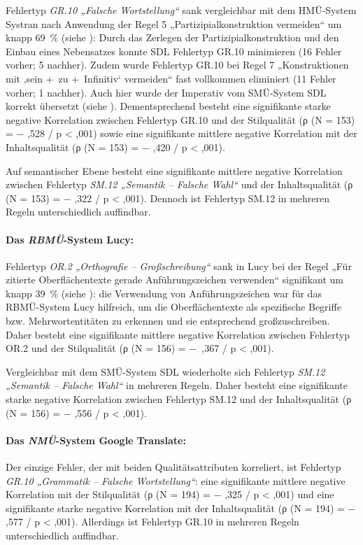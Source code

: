 Fehlertyp \textit{GR.10 „Falsche Wortstellung“} sank vergleichbar mit dem HMÜ-Sys\-tem Systran nach Anwendung der Regel 5 „Partizipialkonstruktion vermeiden“ um knapp 69~\% (siehe ): Durch das Zerlegen der Partizipialkonstruktion und den Einbau eines Nebensatzes konnte SDL Fehlertyp GR.10 minimieren (16 Fehler vorher; 5 nachher). Zudem wurde Fehlertyp GR.10 bei Regel 7 „Konstruktionen mit ‚sein +~zu +~Infinitiv‘ vermeiden“ fast vollkommen eliminiert (11 Fehler vorher; 1 nachher). Auch hier wurde der Imperativ vom SMÜ-System SDL korrekt übersetzt (siehe ). Dementsprechend besteht eine signifikante starke negative Korrelation zwischen Fehlertyp GR.10 und der Stilqualität (ρ (N = 153) = $-$ ,528 / p < ,001) sowie eine signifikante mittlere negative Korrelation mit der Inhaltsqualität (ρ (N = 153) = $-$ ,420 / p < ,001).

Auf semantischer Ebene besteht eine signifikante mittlere negative Korrelation zwischen Fehlertyp \textit{SM.12 „Semantik -- Falsche Wahl“} und der Inhaltsqualität (ρ (N = 153) = $-$ ,322 / p < ,001). Dennoch ist Fehlertyp SM.12 in mehreren Regeln unterschiedlich auffindbar.

\paragraph*{Das \textit{RBMÜ}{}-System Lucy:}
Fehlertyp \textit{OR.2 „Orthografie -- Großschreibung“} sank in Lucy bei der Regel „Für zitierte Oberflächentexte gerade Anführungszeichen verwenden“ signifikant um knapp 39~\% (siehe ): die Verwendung von Anführungszeichen war für das RBMÜ-System Lucy hilfreich, um die Oberflächentexte als spezifische Begriffe bzw. Mehrwortentitäten zu erkennen und sie entsprechend großzuschreiben. Daher besteht eine signifikante mittlere negative Korrelation zwischen Fehlertyp OR.2 und der Stilqualität (ρ (N = 156) = $-$~,367 / p < ,001).

Vergleichbar mit dem SMÜ-System SDL wiederholte sich Fehlertyp \textit{SM.12 „Semantik -- Falsche Wahl“} in mehreren Regeln. Daher besteht eine signifikante starke negative Korrelation zwischen Fehlertyp SM.12 und der Inhaltsqualität (ρ (N = 156) = $-$ ,556 / p < ,001).

\paragraph*{Das \textit{NMÜ}{}-System Google Translate:}
Der einzige Fehler, der mit beiden Qualitätsattributen korreliert, ist Fehlertyp \textit{GR.10 „Grammatik -- Falsche Wortstellung“}: eine signifikante mittlere negative Korrelation mit der Stilqualität  (ρ (N = 194) = $-$ ,325 / p < ,001) und eine signifikante starke negative Korrelation mit der Inhaltsqualität  (ρ (N = 194) = $-$ ,577 / p < ,001). Allerdings ist Fehlertyp GR.10 in mehreren Regeln unterschiedlich auffindbar.

